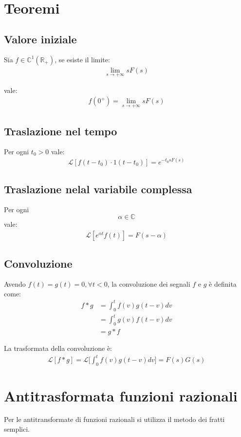 \section{Teoremi}
\subsection{Valore iniziale}
Sia $f \in \mathbb{C}^1(\mathbb{R_+})$, se esiste il limite:
\begin{align}
  \lim_{s \to +\infty} sF(s)
\end{align}

vale:
\begin{align}
  f(0^+) = \lim_{s \to +\infty} sF(s)
\end{align}


\subsection{Traslazione nel tempo}
Per ogni $t_0 > 0$ vale:
\begin{align}
  \mathcal{L} [f(t-t_0) \cdot 1(t-t_0)] = e^{-t_0sF(s)}
\end{align}

\subsection{Traslazione nelal variabile complessa}
Per ogni $$\alpha \in \mathbb{C}$$ vale:
\begin{align}
  \mathcal{L} [e^{\alpha t} f(t)] = F(s-\alpha)
\end{align}



\subsection{Convoluzione}
Avendo $f(t) = g(t) = 0, \forall t < 0$, la convoluzione dei segnali $f$ e $g$ \`e definita come:
\begin{align}
  f * g &= \int_0^t f(v)g(t-v)dv \\ 
  &= \int_0^t g(v)f(t-v)dv \\
  &= g * f
\end{align}

La trasformata della convoluzione \`e:
\begin{align}
  \mathcal{L}[f*g] = \mathcal{L}\Bigg[ \int_0^t f(v)g(t-v)dv \Bigg] = F(s)G(s)
\end{align}


\section{Antitrasformata funzioni razionali}
Per le antitransformate di funzioni razionali si utilizza il metodo dei 
fratti semplici.

